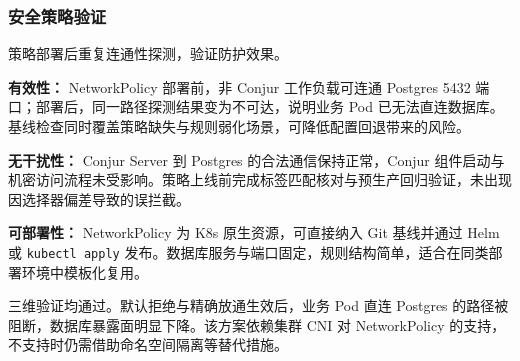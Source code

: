 \subsubsection{安全策略验证}

策略部署后重复连通性探测，验证防护效果。

\textbf{有效性：}
NetworkPolicy 部署前，非 Conjur 工作负载可连通 Postgres 5432 端口；部署后，同一路径探测结果变为不可达，说明业务 Pod 已无法直连数据库。基线检查同时覆盖策略缺失与规则弱化场景，可降低配置回退带来的风险。

\textbf{无干扰性：}
Conjur Server 到 Postgres 的合法通信保持正常，Conjur 组件启动与机密访问流程未受影响。策略上线前完成标签匹配核对与预生产回归验证，未出现因选择器偏差导致的误拦截。

\textbf{可部署性：}
NetworkPolicy 为 K8s 原生资源，可直接纳入 Git 基线并通过 Helm 或 \texttt{kubectl apply} 发布。数据库服务与端口固定，规则结构简单，适合在同类部署环境中模板化复用。

三维验证均通过。默认拒绝与精确放通生效后，业务 Pod 直连 Postgres 的路径被阻断，数据库暴露面明显下降。该方案依赖集群 CNI 对 NetworkPolicy 的支持，不支持时仍需借助命名空间隔离等替代措施。



